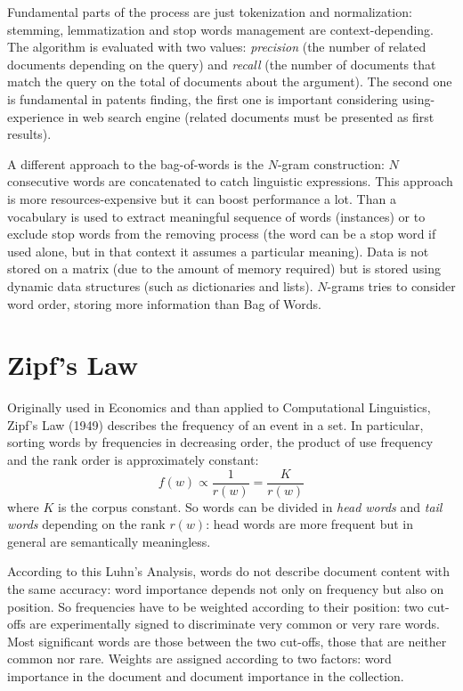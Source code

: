 \documentclass[11pt, a4page]{article}
\begin{document}
Fundamental parts of the process are just tokenization and normalization: stemming, lemmatization and stop words management are context-depending.
The algorithm is evaluated with two values: \textit{precision} (the number of related documents depending on the query) and \textit{recall} (the number of documents that match the query on the total of documents about the argument).
The second one is fundamental in patents finding, the first one is important considering using-experience in web search engine (related documents must be presented as first results). \newline

A different approach to the bag-of-words is the $N$-gram construction: $N$ consecutive words are concatenated to catch linguistic expressions.
This approach is more resources-expensive but it can boost performance a lot.
Than a vocabulary is used to extract meaningful sequence of words (instances) or to exclude stop words from the removing process (the word can be a stop word if used alone, but in that context it assumes a particular meaning).
Data is not stored on a matrix (due to the amount of memory required) but is stored using dynamic data structures (such as dictionaries and lists).
$N$-grams tries to consider word order, storing more information than Bag of Words.

\section{Zipf's Law}
Originally used in Economics and than applied to Computational Linguistics, Zipf's Law (1949) describes the frequency of an event in a set.
In particular, sorting words by frequencies in decreasing order, the product of use frequency and the rank order is approximately constant:
\begin{equation*}
  f(w) \propto \frac{1}{r(w)} = \frac{K}{r(w)}
\end{equation*}
where $K$ is the corpus constant.
So words can be divided in \textit{head words} and \textit{tail words} depending on the rank $r(w)$: head words are more frequent but in general are semantically meaningless.

According to this Luhn's Analysis, words do not describe document content with the same accuracy: word importance depends not only on frequency but also on position.
So frequencies have to be weighted according to their position: two cut-offs are experimentally signed to discriminate very common or very rare words.
Most significant words are those between the two cut-offs, those that are neither common nor rare.
Weights are assigned according to two factors: word importance in the document and document importance in the collection.
\end{document}
